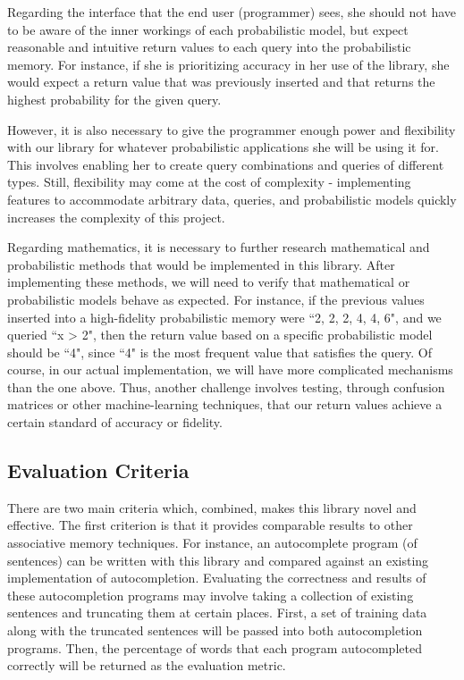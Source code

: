 \documentclass{sig-alternate}
\begin{document}
Regarding the interface that the end user (programmer) sees, she should not have to be aware of 
the inner workings of each probabilistic model, but expect reasonable and intuitive return values
to each query into the probabilistic memory. For instance, if she is prioritizing accuracy 
in her use of the library, she would expect a return value that was previously inserted and that 
returns the highest probability for the given query.

However, it is also necessary to give the programmer enough power and flexibility with our library for 
whatever probabilistic applications she will be using it for. This involves enabling 
her to create query combinations and queries of different types. Still, flexibility may 
come at the cost of complexity - implementing features to accommodate arbitrary data, queries,
and probabilistic models quickly increases the complexity of this project. 

Regarding mathematics, it is necessary to further research mathematical 
and probabilistic methods that would be implemented in this library. After implementing these methods,
we will need to verify that mathematical or probabilistic models behave as expected. 
For instance, if the previous values inserted into a high-fidelity probabilistic memory were ``2, 2, 2, 4, 4, 6", and we queried ``x > 2", 
then the return value based on a specific probabilistic model should be ``4", since ``4" is the most frequent value that satisfies the query.
Of course, in our actual implementation, we will have more complicated mechanisms than the one above.
Thus, another challenge involves testing, through confusion matrices or other machine-learning techniques,
that our return values achieve a certain standard of accuracy or fidelity.

\subsection{Evaluation Criteria}
\label{subsec:eval_criteria}
There are two main criteria which, combined, makes this library novel and effective. 
The first criterion is that it provides comparable results to other associative memory techniques. 
For instance, an autocomplete program (of sentences) can be written with this library and compared against an existing implementation of autocompletion. 
Evaluating the correctness and results of these autocompletion programs may involve taking a collection of existing sentences and truncating them
at certain places. First, a set of training data along with the truncated sentences will be passed into both autocompletion programs. 
Then, the percentage of words that each program autocompleted correctly will be returned as the evaluation metric. 
\end{document}
